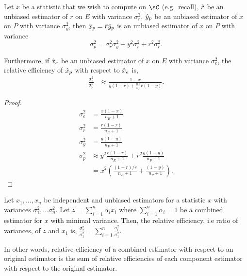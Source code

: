 \begin{theorem} 
  \label{thm:variance-pooled-recall}
  Let $x$ be a statistic that we wish to compute on $\sC$ (e.g.\ recall),
    $\hat{r}$ be an unbiased estimator of $r$ on $E$ with variance $\sigma_r^2$,
    $\hat{y}_p$ be an unbiased estimator of $x$ on $P$ with variance $\sigma_y^2$,
  then $\hat{x}_p = \hat{r} \hat{y}_p$ is an unbiased estimator of $x$ on $P$ with variance
  $$
  \sigma_p^2 = \sigma_r^2 \sigma_y^2 + y^2 \sigma_r^2 + r^2 \sigma_r^2.
  $$

  Furthermore, if $\hat{x}_e$ be an unbiased estimator of $x$ on $E$ with variance $\sigma_e^2$,
  the relative efficiency of $\hat{x}_p$ with respect to $\hat{x}_e$ is,
  \begin{align*}
  \frac{\sigma_e^2}{\sigma_p^2}
  &\approx \frac{1-x}
      {
      y (1-r) + \frac{n_E}{n_P} r (1-y)
      }.
  \end{align*}
\end{theorem}
\begin{proof}
  \begin{align*}
    \sigma_e^2 &= \frac{x (1-x)}{n_E + 1} \\
    \sigma_r^2 &= \frac{r (1-r)}{n_E + 1} \\
    \sigma_y^2 &= \frac{y (1-y)}{n_P + 1} \\
    \sigma_p^2 
    &\approx y^2 \frac{r (1-r)}{n_E + 1} + r^2 \frac{y (1-y)}{n_P + 1} \\
    &= x^2 \left( \frac{(1-r)/r}{n_E + 1} + \frac{(1-y)}{n_P + 1} \right).
  \end{align*}
\end{proof}

\begin{lemma}
  Let $x_1, \dots, x_n$ be independent and unbiased estimators for a statistic $x$ with variances $\sigma_1^2, \dots \sigma_n^2$.
  Let $z = \sum_{i=1}^n \alpha_i x_i$ where $\sum_{i=1}^n \alpha_i = 1$ be a combined estimator for $x$ with minimal variance.
  Then, the relative efficiency, i.e ratio of variances, of $z$ and $x_1$ is,
  $\frac{\sigma_z^2}{\sigma_1^2} = \sum_{i=1}^n \frac{\sigma_i^2}{\sigma_1^2}$.

  In other words, relative efficiency of a combined estimator with respect
  to an original estimator is the sum of relative efficiencies of each component
  estimator with respect to the original estimator. 
\end{lemma}



